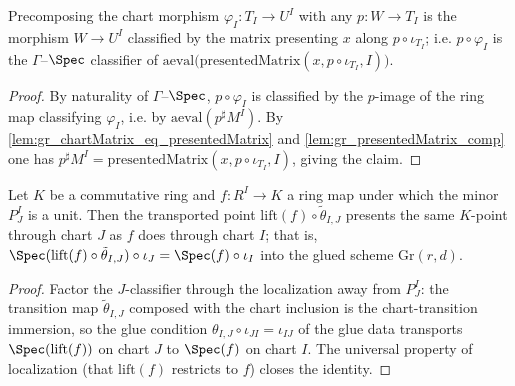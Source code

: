 \begin{lemma}
  \label{lem:gr_comp_chartMorphism}
  Precomposing the chart morphism \(\varphi_I : T_I \to U^I\) with any \(p : W \to T_I\) is
  the morphism \(W \to U^I\) classified by the matrix presenting \(x\) along
  \(p\circ\iota_{T_I}\); i.e. \(p \circ \varphi_I\) is the \(\Gamma\)--\(\Spec\) classifier of
  \(\mathrm{aeval}\bigl(\mathrm{presentedMatrix}(x, p\circ\iota_{T_I}, I)\bigr)\).
\end{lemma}
\begin{proof}
  \leanok
  By naturality of \(\Gamma\)--\(\Spec\), \(p\circ\varphi_I\) is classified by the \(p\)-image
  of the ring map classifying \(\varphi_I\), i.e. by \(\mathrm{aeval}(p^{\sharp}M^I)\). By
  \cref{lem:gr_chartMatrix_eq_presentedMatrix} and \cref{lem:gr_presentedMatrix_comp} one has
  \(p^{\sharp}M^I = \mathrm{presentedMatrix}(x, p\circ\iota_{T_I}, I)\), giving the claim.
\end{proof}

\begin{lemma}
  \label{lem:gr_chart_point_eq}
  Let \(K\) be a commutative ring and \(f : R^I \to K\) a ring map under which the minor
  \(P^I_J\) is a unit. Then the transported point
  \(\mathrm{lift}(f)\circ\tilde\theta_{I,J}\) presents the same \(K\)-point through chart
  \(J\) as \(f\) does through chart \(I\); that is,
  \(\Spec(\mathrm{lift}(f)\circ\tilde\theta_{I,J})\circ\iota_J = \Spec(f)\circ\iota_I\) into
  the glued scheme \(\mathrm{Gr}(r,d)\).
\end{lemma}
\begin{proof}

\leanok
  Factor the \(J\)-classifier through the localization away from \(P^I_J\): the transition map
  \(\tilde\theta_{I,J}\) composed with the chart inclusion is the chart-transition immersion,
  so the glue condition \(\theta_{I,J}\circ\iota_{JI} = \iota_{IJ}\) of the glue data
  transports \(\Spec(\mathrm{lift}(f))\) on chart \(J\) to \(\Spec(f)\) on chart \(I\). The
  universal property of localization (that \(\mathrm{lift}(f)\) restricts to \(f\)) closes the
  identity.
\end{proof}

